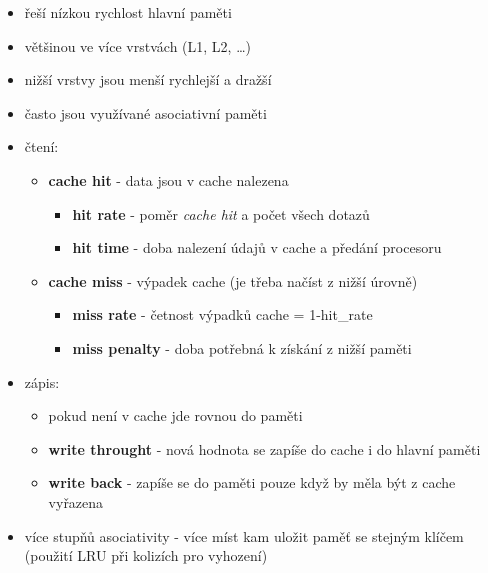 \documentclass{szzclass}
\providecommand{\tightlist}{%
  \setlength{\itemsep}{0pt}\setlength{\parskip}{0pt}}
\begin{document}
\begin{itemize}
\tightlist
\item
  řeší nízkou rychlost hlavní paměti
\item
  většinou ve více vrstvách (L1, L2, \ldots)
\item
  nižší vrstvy jsou menší rychlejší a dražší
\item
  často jsou využívané asociativní paměti
\item
  čtení:

  \begin{itemize}
  \tightlist
  \item
    \textbf{cache hit} - data jsou v cache nalezena

    \begin{itemize}
    \tightlist
    \item
      \textbf{hit rate} - poměr \emph{cache hit} a počet všech dotazů
    \item
      \textbf{hit time} - doba nalezení údajů v cache a předání
      procesoru
    \end{itemize}
  \item
    \textbf{cache miss} - výpadek cache (je třeba načíst z nižší úrovně)

    \begin{itemize}
    \tightlist
    \item
      \textbf{miss rate} - četnost výpadků cache = 1-hit\_rate
    \item
      \textbf{miss penalty} - doba potřebná k získání z nižší paměti
    \end{itemize}
  \end{itemize}
\item
  zápis:

  \begin{itemize}
  \tightlist
  \item
    pokud není v cache jde rovnou do paměti
  \item
    \textbf{write throught} - nová hodnota se zapíše do cache i do
    hlavní paměti
  \item
    \textbf{write back} - zapíše se do paměti pouze když by měla být z
    cache vyřazena
  \end{itemize}
\item
  více stupňů asociativity - více míst kam uložit paměť se stejným
  klíčem (použití LRU při kolizích pro vyhození)
\end{itemize}
\end{document}
